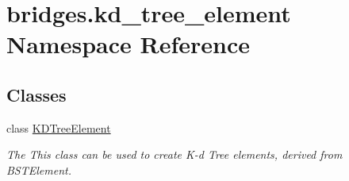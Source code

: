 \hypertarget{namespacebridges_1_1kd__tree__element}{}\section{bridges.\+kd\+\_\+tree\+\_\+element Namespace Reference}
\label{namespacebridges_1_1kd__tree__element}
\subsection*{Classes}
\begin{DoxyCompactItemize}
\item 
class \hyperlink{classbridges_1_1kd__tree__element_1_1_k_d_tree_element}{K\+D\+Tree\+Element}
\begin{DoxyCompactList}\small\item\em The This class can be used to create K-\/d Tree elements, derived from B\+S\+T\+Element. \end{DoxyCompactList}\end{DoxyCompactItemize}
